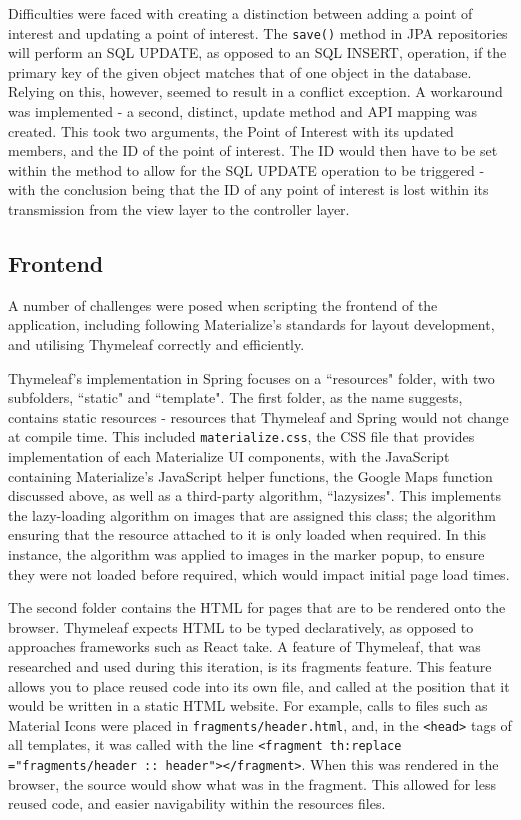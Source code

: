 Difficulties were faced with creating a distinction between adding a point of interest and updating a point of interest. The \texttt{save()} method in JPA repositories will perform an SQL UPDATE, as opposed to an SQL INSERT, operation, if the primary key of the given object matches that of one object in the database. Relying on this, however, seemed to result in a conflict exception. A workaround was implemented - a second, distinct, update method and API mapping was created. This took two arguments, the Point of Interest with its updated members, and the ID of the point of interest. The ID would then have to be set within the method to allow for the SQL UPDATE operation to be triggered - with the conclusion being that the ID of any point of interest is lost within its transmission from the view layer to the controller layer.

\subsection{Frontend}

A number of challenges were posed when scripting the frontend of the application, including following Materialize's standards for layout development, and utilising Thymeleaf correctly and efficiently.

Thymeleaf's implementation in Spring focuses on a ``resources" folder, with two subfolders, ``static" and ``template". The first folder, as the name suggests, contains static resources - resources that Thymeleaf and Spring would not change at compile time. This included \texttt{materialize.css}, the CSS file that provides implementation of each Materialize UI components, with the JavaScript containing Materialize's JavaScript helper functions, the Google Maps function discussed above, as well as a third-party algorithm, ``lazysizes"\cite{lazysizes}. This implements the lazy-loading algorithm on images that are assigned this class; the algorithm ensuring that the resource attached to it is only loaded when required. In this instance, the algorithm was applied to images in the marker popup, to ensure they were not loaded before required, which would impact initial page load times.

The second folder contains the HTML for pages that are to be rendered onto the browser. Thymeleaf expects HTML to be typed declaratively, as opposed to approaches frameworks such as React take. A feature of Thymeleaf, that was researched and used during this iteration, is its fragments feature. This feature allows you to place reused code into its own file, and called at the position that it would be written in a static HTML website. For example, calls to files such as Material Icons were placed in \texttt{fragments/header.html}, and, in the \texttt{<head>} tags of all templates, it was called with the line \texttt{<fragment th:replace
="fragments/header :: header"></fragment>}. When this was rendered in the browser, the source would show what was in the fragment. This allowed for less reused code, and easier navigability within the resources files.

